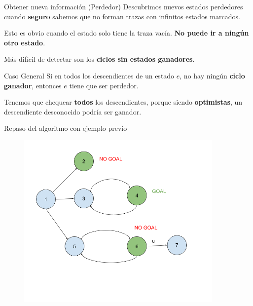 \begin{frame}{Obtener nueva información (Perdedor)}
	Descubrimos nuevos estados perdedores cuando \textbf{seguro} sabemos que no forman trazas con infinitos estados marcados.
	
	\pause 
	
	Esto es obvio cuando el estado solo tiene la traza vacía. \textbf{No puede ir a ningún otro estado}.
	
	\pause 
	
	Más difícil de detectar son los \textbf{ciclos sin estados ganadores}.
	
	\pause
	
	\begin{block}{Caso General}
		Si en todos los descendientes de un estado $e$, no hay ningún \textbf{ciclo ganador}, entonces $e$ tiene que ser perdedor. 
		
		Tenemos que chequear \textbf{todos} los descendientes, porque siendo \textbf{optimistas}, un descendiente desconocido podría ser ganador.
	\end{block}
	
\end{frame}
\begin{frame}{Repaso del algoritmo con ejemplo previo}
	\begin{figure}
		\includegraphics[width=0.9\textwidth]{figures/como-marcar-goals-FACAS.png}
	\end{figure}
\end{frame}
